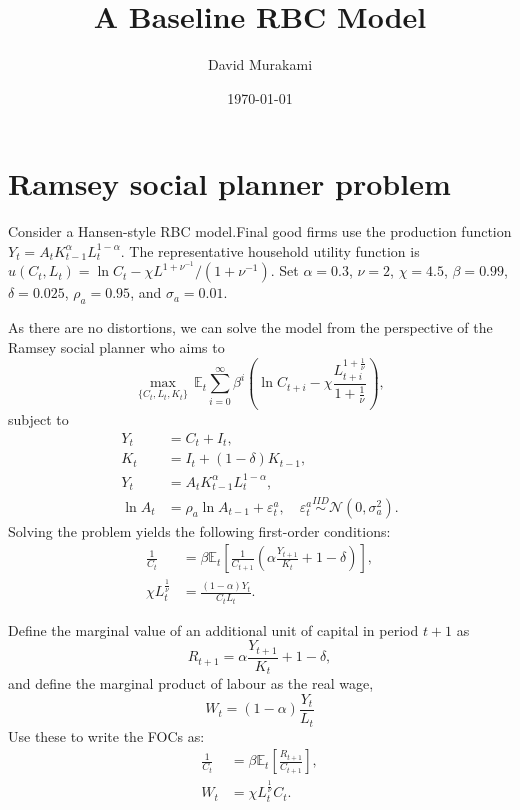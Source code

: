 \documentclass[12pt,english]{extarticle}
\title{\textbf{A Baseline RBC Model}}
\author{David Murakami}
\date{\today}
\newcommand{\E}{\mathbb{E}}
\begin{document}
	\maketitle
	
	\section*{Ramsey social planner problem}
	\label{sec: baseline RBC model}
	Consider a Hansen-style RBC model.Final good firms use the production function $Y_t = A_tK_{t-1}^\alpha L_t^{1-\alpha}$. The representative household utility function is $u(C_t,L_t) = \ln C_t - \chi L^{1+\nu^{-1}}/(1+\nu^{-1})$. Set $\alpha=0.3$, $\nu=2$, $\chi=4.5$, $\beta=0.99$, $\delta=0.025$, $\rho_a=0.95$, and $\sigma_a=0.01$.
	
	As there are no distortions, we can solve the model from the perspective of the Ramsey social planner who aims to
	\begin{equation*}
		\max_{\{C_t,L_t,K_t\}} \, \E_t \sum_{i=0}^\infty \beta^i \left(\ln C_{t+i} - \chi \frac{L_{t+i}^{1+\frac{1}{\nu}}}{1+\frac{1}{\nu}} \right),
	\end{equation*}
	subject to 
	\begin{align}
		\label{eq: aggregate resource constraint RBC}
		Y_t &= C_t + I_t, \\
		\label{eq: law of motion of capital RBC}
		K_t &= I_t + (1-\delta)K_{t-1}, \\
		\label{eq: production function RBC}
		Y_t &= A_tK_{t-1}^\alpha L_t^{1-\alpha}, \\
		\label{eq: TFP process RBC}
		\ln A_t &= \rho_a \ln A_{t-1} + \varepsilon_t^a, \quad \varepsilon_t^a \overset{IID}{\sim} \mathcal{N}(0,\sigma_a^2).
	\end{align}
	Solving the problem yields the following first-order conditions:
	\begin{align*}
		\frac{1}{C_t} &= \beta \E_t\left[\frac{1}{C_{t+1}}\left(\alpha\frac{Y_{t+1}}{K_t} + 1 - \delta\right)\right], \\
		\chi L_t^{\frac{1}{\nu}} &= \frac{(1-\alpha)Y_t}{C_tL_t}.
	\end{align*}
	
	Define the marginal value of an additional unit of capital in period $t+1$ as
	\begin{equation}
		\label{eq: capital return RBC}
		R_{t+1} = \alpha\frac{Y_{t+1}}{K_t} + 1 - \delta,
	\end{equation}
	and define the marginal product of labour as the real wage,
	\begin{equation}
		\label{eq: wages RBC}
		W_t = (1-\alpha)\frac{Y_t}{L_t}
	\end{equation}
	Use these to write the FOCs as:
	\begin{align}
		\label{eq: consumption euler equation RBC}
		\frac{1}{C_t} &= \beta \E_t\left[\frac{R_{t+1}}{C_{t+1}}\right], \\
		\label{eq: intratemporal euler equation RBC}
		W_t &= \chi L_t^\frac{1}{\nu}C_t.
	\end{align}
	
\end{document}
